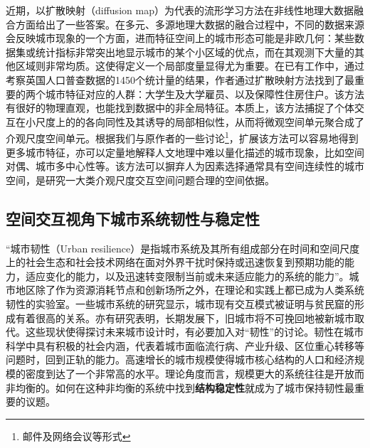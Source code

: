 近期，以扩散映射（diffusion map）\cite{barter2019manifold}为代表的流形学习方法在非线性地理大数据融合方面给出了一些答案。在多元、多源地理大数据的融合过程中，不同的数据来源会反映城市现象的一个方面，进而特征空间上的城市形态可能是非欧几何：某些数据集或统计指标非常突出地显示城市的某个小区域的优点，而在其观测下大量的其他区域则非常均质。这使得定义一个局部度量显得尤为重要。在已有工作\cite{barter2019manifold}中，通过考察英国人口普查数据的1450个统计量的结果，作者通过扩散映射方法找到了最重要的两个城市特征对应的人群：大学生及大学雇员、以及保障性住房住户。该方法有很好的物理直观，也能找到数据中的非全局特征。本质上，该方法捕捉了个体交互在小尺度上的的各向同性及其诱导的局部相似性，从而将微观空间单元聚合成了介观尺度空间单元。根据我们与原作者的一些讨论\footnote{邮件及网络会议等形式}，扩展该方法可以容易地得到更多城市特征，亦可以定量地解释人文地理中难以量化描述的城市现象，比如空间对偶\cite{lomi2000density}、城市多中心性等\cite{gordon1986distribution, mcmillen1997nonparametric}。该方法可以摒弃人为因素选择通常具有空间连续性的城市空间，是研究一大类介观尺度交互空间问题合理的空间依据。

\subsection{空间交互视角下城市系统韧性与稳定性}

“城市韧性（Urban resilience）是指城市系统及其所有组成部分在时间和空间尺度上的社会生态和社会技术网络在面对外界干扰时保持或迅速恢复到预期功能的能力，适应变化的能力，以及迅速转变限制当前或未来适应能力的系统的能力”\cite{meerow2016defining}。城市地区除了作为资源消耗节点和创新场所之外，在理论和实践上都已成为人类系统韧性的实验室\cite{meerow2016defining}。一些城市系统的研究显示，城市现有交互模式被证明与贫民窟的形成有着很高的关系\cite{brelsford2018toward}。亦有研究表明，长期发展下，旧城市将不可挽回地被新城市取代\cite{fujita1997structural, cottineau2017diverse}。这些现状使得探讨未来城市设计时，有必要加入对“韧性”的讨论。韧性在城市科学中具有积极的社会内涵，代表着城市面临流行病、产业升级、区位重心转移等问题时，回到正轨的能力\cite{mcevoy2013resilience, o2013deconstructing}。高速增长的城市规模使得城市核心结构的人口和经济规模的密度到达了一个非常高的水平。理论角度而言，规模更大的系统往往是开放而非均衡的\cite{louf2013modeling,may1972will}。如何在这种非均衡的系统中找到\textbf{结构稳定性}就成为了城市保持韧性最重要的议题。

